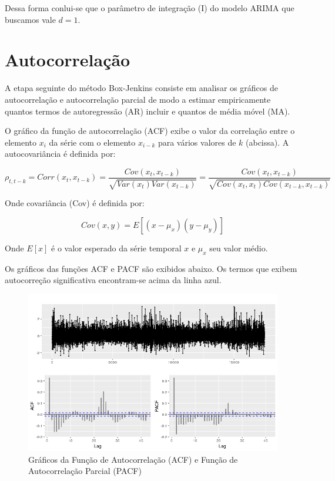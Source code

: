 \documentclass[
	12pt,				%
	openright,			%
	oneside,			%
	a4paper,			%
	english,			%
	french,				%
	spanish,			%
	brazil				%
	]{abntex2}
\begin{document}
Dessa forma conlui-se que o parâmetro de integração (I) do modelo ARIMA que buscamos vale $d=1$.

\section{Autocorrelação}

A etapa seguinte do método Box-Jenkins consiste em analisar os gráficos de autocorrelação e autocorrelação parcial de modo a estimar empiricamente quantos termos de autoregressão (AR) incluir e quantos de média móvel (MA).

O gráfico da função de autocorrelação (ACF) exibe o valor da correlação entre o elemento $x_i$ da série com o elemento $x_{i-k}$ para vários valores de $k$ (abcissa). A autocovariância  é definida por:

\begin{equation}
\rho_{t,t-k} = Corr(x_t, x_{t-k}) = \frac{Cov(x_t, x_{t-k})}{\sqrt{Var(x_t)Var(x_{t-k})}} = \frac{Cov(x_t, x_{t-k})}{\sqrt{Cov(x_t,x_t)Cov(x_{t-k},x_{t-k})}}
\end{equation}

Onde covariância (Cov) é definida por:

\begin{equation}
Cov(x,y) = E\left[(x-\mu_x)(y-\mu_y)\right]
\end{equation}

Onde $E[x]$ é o valor esperado da série temporal $x$ e $\mu_x$ seu valor médio.

Os gráficos das funções ACF e PACF são exibidos abaixo. Os termos que exibem autocorreção significativa encontram-se acima da linha azul.

\begin{figure}[h]
    \centering
	\includegraphics[width=\textwidth]{long_memory.png}
	\caption{Gráficos da Função de Autocorrelação (ACF) e Função de Autocorrelação Parcial (PACF)}
\end{figure}
\FloatBarrier 
\end{document}
